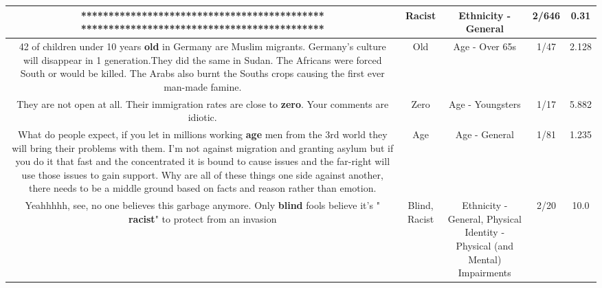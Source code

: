 \documentclass[11pt]{article}
\newlength\mylength
\begin{document}
\begin{center}
\begin{longtable}{|C{.65\mylength}|C{.30\mylength}|C{.12\mylength}|C{.12\mylength}|C{.12\mylength}|}
********************************************
********************************************\normalsize   & Racist & Ethnicity - General & 2/646 & 0.31 \\  \hline
  \small 42 of children under 10 years \textbf{old} in Germany are Muslim migrants. Germany's culture will disappear in 1 generation.They did the same in Sudan. The Africans were forced South or would be killed. The Arabs also burnt the Souths crops causing the first ever man-made famine.\normalsize   & Old & Age - Over 65s & 1/47 & 2.128 \\  \hline
  \small They are not open at all. Their immigration rates are close to \textbf{zero}. Your comments are idiotic.\normalsize   & Zero & Age - Youngsters & 1/17 & 5.882 \\  \hline
  \small What do people expect, if you let in millions working \textbf{age} men from the 3rd world they will bring their problems with them. I'm not against migration and granting asylum but if you do it that fast and the concentrated it is bound to cause issues and the far-right will use those issues to gain support. Why are all of these things one side against another, there needs to be a middle ground based on facts and reason rather than emotion.\normalsize   & Age & Age - General & 1/81 & 1.235 \\  \hline
  \small Yeahhhhh, see, no one believes this garbage anymore. Only \textbf{blind} fools believe it's " \textbf{racist}" to protect from an invasion\normalsize   & Blind, Racist & Ethnicity - General, Physical Identity - Physical (and Mental) Impairments & 2/20 & 10.0 \\  \hline

\end{longtable}
\end{center}
\end{document}
